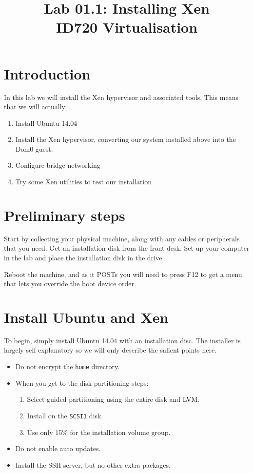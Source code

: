 \documentclass{article}
\begin{document}
\title{Lab 01.1: Installing Xen \\ ID720 Virtualisation}
\date{}
\maketitle

\section*{Introduction}
In this lab we will install the Xen hypervisor and associated tools. This means that we will actually

\begin{enumerate}
  \item Install Ubuntu 14.04 
  \item Install the Xen hypervisor, converting our system installed above into the Dom0 guest.
  \item Configure bridge networking 
  \item Try some Xen utilities to test our installation
\end{enumerate}

\section{Preliminary steps}
Start by collecting your physical machine, along with any cables or peripherals that you need. Get an installation disk from the front desk. Set up your computer in the lab and place the installation disk in the drive.

Reboot the machine, and as it POSTs you will need to press F12 to get a menu that lets you override the boot device order.

\section{Install Ubuntu and Xen}
To begin, simply install Ubuntu 14.04 with an installation disc. The installer is largely self explanatory so we will only describe the salient points here.

\begin{itemize}
  \item Do not encrypt the \texttt{home} directory.
  \item When you get to the disk partitioning steps:
           \begin{enumerate}
             \item Select guided partitioning using the entire disk and LVM.
             \item Install on the \texttt{SCSI1} disk.
             \item Use only 15\% for the installation volume group.
           \end{enumerate}
   \item Do not enable auto updates.
   \item Install the SSH server, but no other extra packages.
 \end{itemize}
 
\end{document}

